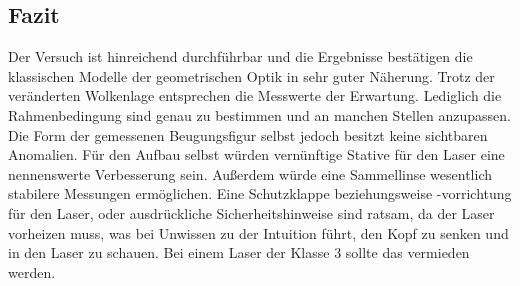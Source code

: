 \subsection{Fazit}
Der Versuch ist hinreichend durchführbar und die Ergebnisse bestätigen die klassischen Modelle der geometrischen Optik in sehr guter Näherung.
Trotz der veränderten Wolkenlage entsprechen die Messwerte der Erwartung.
Lediglich die Rahmenbedingung sind genau zu bestimmen und an manchen Stellen anzupassen. Die Form der gemessenen Beugungsfigur selbst jedoch besitzt keine sichtbaren Anomalien.
Für den Aufbau selbst würden vernünftige Stative für den Laser eine nennenswerte Verbesserung sein. Außerdem würde eine Sammellinse wesentlich stabilere Messungen ermöglichen.
Eine Schutzklappe beziehungsweise -vorrichtung für den Laser, oder ausdrückliche Sicherheitshinweise sind ratsam, da der Laser vorheizen muss, was bei Unwissen zu der Intuition führt,
den Kopf zu senken und in den Laser zu schauen. Bei einem Laser der Klasse 3 sollte das vermieden werden.